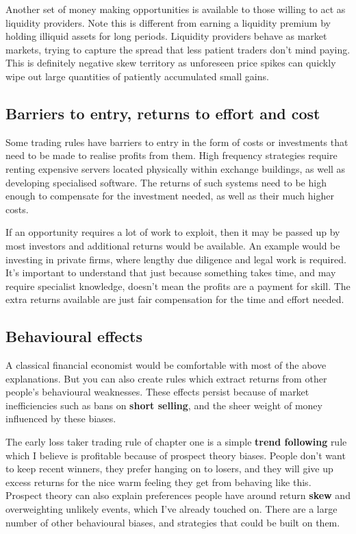Another set of money making opportunities is available to those willing to act as liquidity providers. Note this is different from earning a liquidity premium by holding illiquid assets for long periods. Liquidity providers behave as market markets, trying to capture the spread that less patient traders don't mind paying. This is definitely negative skew territory as unforeseen price spikes can quickly wipe out large quantities of patiently accumulated small gains.

\subsection*{Barriers to entry, returns to effort and cost}

Some trading rules have barriers to entry in the form of costs or investments that need to be made to realise profits from them. High frequency strategies require renting expensive servers located physically within exchange buildings, as well as developing specialised software. The returns of such systems need to be high enough to compensate for the investment needed, as well as their much higher costs.

If an opportunity requires a lot of work to exploit, then it may be passed up by most investors and additional returns would be available. An example would be investing in private firms, where lengthy due diligence and legal work is required. It's important to understand that just because something takes time, and may require specialist knowledge, doesn't mean the profits are a payment for skill. The extra returns available are just fair compensation for the time and effort needed.

\subsection*{Behavioural effects}

A classical financial economist would be comfortable with most of the above explanations. But you can also create rules which extract returns from other people's behavioural weaknesses. These effects persist because of market inefficiencies such as bans on \textbf{short selling}, and the sheer weight of money influenced by these biases.

The early loss taker trading rule of chapter one is a simple \textbf{trend following} rule which I believe is profitable because of prospect theory biases. People don't want to keep recent winners, they prefer hanging on to losers, and they will give up excess returns for the nice warm feeling they get from behaving like this. Prospect theory can also explain preferences people have around return \textbf{skew} and overweighting unlikely events, which I've already touched on. There are a large number of other behavioural biases, and strategies that could be built on them.

